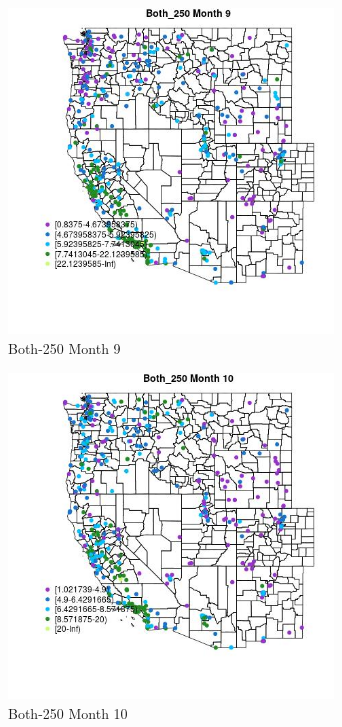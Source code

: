 \begin{figure} 
\centering  
\includegraphics[width=0.77\textwidth]{Code_Outputs/ML_input_report_ML_input_PM25_Step5_part_d_de_duplicated_aves_ML_input_MapObsMo9Both_250.jpg} 
\caption{\label{fig:ML_input_report_ML_input_PM25_Step5_part_d_de_duplicated_aves_ML_inputMapObsMo9Both_250}Both-250 Month 9} 
\end{figure} 
 

\begin{figure} 
\centering  
\includegraphics[width=0.77\textwidth]{Code_Outputs/ML_input_report_ML_input_PM25_Step5_part_d_de_duplicated_aves_ML_input_MapObsMo10Both_250.jpg} 
\caption{\label{fig:ML_input_report_ML_input_PM25_Step5_part_d_de_duplicated_aves_ML_inputMapObsMo10Both_250}Both-250 Month 10} 
\end{figure} 
 

